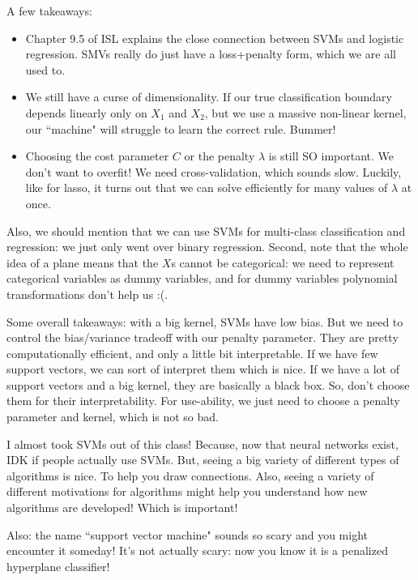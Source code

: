 A few takeaways:
\begin{itemize}
\item Chapter 9.5 of ISL explains the close connection between SVMs and logistic regression. SMVs really do just have a loss+penalty form, which we are all used to. 
\item We still have a curse of dimensionality. If our true classification boundary depends linearly only on $X_1$ and $X_2$, but we use a massive non-linear kernel, our ``machine" will struggle to learn the correct rule. Bummer!
\item Choosing the cost parameter $C$ or the penalty $\lambda$ is still SO important. We don't want to overfit! We need cross-validation, which sounds slow. Luckily, like for lasso, it turns out that we can solve efficiently for many values of $\lambda$ at once. 	
\end{itemize}

Also, we should mention that we can use SVMs for multi-class classification and regression: we just only went over binary regression. Second, note that the whole idea of a plane means that the $X$s cannot be categorical: we need to represent categorical variables as dummy variables, and for dummy variables polynomial transformations don't help us :(. 

Some overall takeaways: with a big kernel, SVMs have low bias. But we need to control the bias/variance tradeoff with our penalty parameter. They are pretty computationally efficient, and only a little bit interpretable. If we have few support vectors, we can sort of interpret them which is nice. If we have a lot of support vectors and a big kernel, they are basically a black box. So, don't choose them for their interpretability. For use-ability, we just need to choose a penalty parameter and kernel, which is not so bad.

I almost took SVMs out of this class! Because, now that neural networks exist, IDK if people actually use SVMs. But, seeing a big variety of different types of algorithms is nice. To help you draw connections. Also, seeing a variety of different motivations for algorithms might help you understand how new algorithms are developed! Which is important!

Also: the name ``support vector machine" sounds so scary and you might encounter it someday! It's not actually scary: now you know it is a penalized hyperplane classifier!










